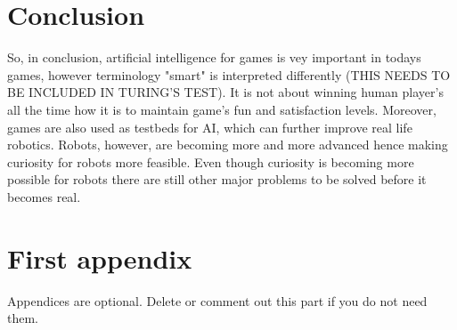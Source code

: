\documentclass[journal]{IEEEtran}
\begin{document}
\section{Conclusion}
So, in conclusion, artificial intelligence for games is vey important in todays games, however terminology "smart" is interpreted differently (THIS NEEDS TO BE INCLUDED IN TURING'S TEST). It is not about winning human player's all the time how it is to maintain game's fun and satisfaction levels. Moreover, games are also used as testbeds for AI, which can further improve real life robotics. Robots, however, are becoming more and more advanced hence making curiosity for robots more feasible. Even though curiosity is becoming more possible for robots there are still other major problems to be solved before it becomes real.






\appendices
\section{First appendix}
Appendices are optional. Delete or comment out this part if you do not need them.


\end{document}
